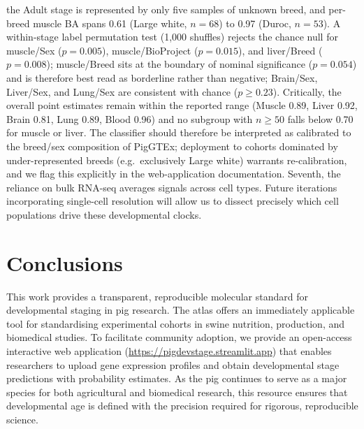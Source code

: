 \documentclass[10pt,a4paper]{article}
\begin{document}
the Adult stage is represented by only five samples of unknown breed, and per-breed muscle BA spans 0.61 (Large white, $n=68$) to 0.97 (Duroc, $n=53$). A within-stage label permutation test (1{,}000 shuffles) rejects the chance null for muscle/Sex ($p=0.005$), muscle/BioProject ($p=0.015$), and liver/Breed ($p=0.008$); muscle/Breed sits at the boundary of nominal significance ($p=0.054$) and is therefore best read as borderline rather than negative; Brain/Sex, Liver/Sex, and Lung/Sex are consistent with chance ($p \geq 0.23$). Critically, the overall point estimates remain within the reported range (Muscle 0.89, Liver 0.92, Brain 0.81, Lung 0.89, Blood 0.96) and no subgroup with $n \geq 50$ falls below 0.70 for muscle or liver. The classifier should therefore be interpreted as calibrated to the breed/sex composition of PigGTEx; deployment to cohorts dominated by under-represented breeds (e.g.\ exclusively Large white) warrants re-calibration, and we flag this explicitly in the web-application documentation. Seventh, the reliance on bulk RNA-seq averages signals across cell types. Future iterations incorporating single-cell resolution\cite{schaum_single-cell_2018} will allow us to dissect precisely which cell populations drive these developmental clocks.

\section{Conclusions}

This work provides a transparent, reproducible molecular standard for developmental staging in pig research. The atlas offers an immediately applicable tool for standardising experimental cohorts in swine nutrition, production, and biomedical studies. To facilitate community adoption, we provide an open-access interactive web application (\url{https://pigdevstage.streamlit.app}) that enables researchers to upload gene expression profiles and obtain developmental stage predictions with probability estimates. As the pig continues to serve as a major species for both agricultural and biomedical research, this resource ensures that developmental age is defined with the precision required for rigorous, reproducible science.

\end{document}
